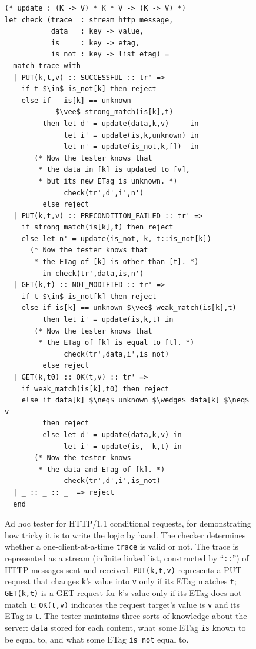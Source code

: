 \documentclass{article}
\newcommand{\http}{HTTP/1.1\xspace}
\newcommand{\ilc}[1]{\lstinline[style=customcoq]{#1}}
\theoremstyle{definition}
\begin{document}
\begin{figure}
  \begin{lstlisting}[style=customcoq,mathescape=true]
(* update : (K -> V) * K * V -> (K -> V) *)
let check (trace  : stream http_message,
           data   : key -> value,
           is     : key -> etag,
           is_not : key -> list etag) =
  match trace with
  | PUT(k,t,v) :: SUCCESSFUL :: tr' =>
    if t $\in$ is_not[k] then reject
    else if   is[k] == unknown
            $\vee$ strong_match(is[k],t)
         then let d' = update(data,k,v)     in
              let i' = update(is,k,unknown) in
              let n' = update(is_not,k,[])  in
       (* Now the tester knows that
        * the data in [k] is updated to [v],
        * but its new ETag is unknown. *)
              check(tr',d',i',n')
         else reject
  | PUT(k,t,v) :: PRECONDITION_FAILED :: tr' =>
    if strong_match(is[k],t) then reject
    else let n' = update(is_not, k, t::is_not[k])
      (* Now the tester knows that
       * the ETag of [k] is other than [t]. *)
         in check(tr',data,is,n')
  | GET(k,t) :: NOT_MODIFIED :: tr' =>
    if t $\in$ is_not[k] then reject
    else if is[k] == unknown $\vee$ weak_match(is[k],t)
         then let i' = update(is,k,t) in
       (* Now the tester knows that
        * the ETag of [k] is equal to [t]. *)
              check(tr',data,i',is_not)
         else reject
  | GET(k,t0) :: OK(t,v) :: tr' =>
    if weak_match(is[k],t0) then reject
    else if data[k] $\neq$ unknown $\wedge$ data[k] $\neq$ v
         then reject
         else let d' = update(data,k,v) in
              let i' = update(is,  k,t) in
       (* Now the tester knows
        * the data and ETag of [k]. *)
              check(tr',d',i',is_not)
  | _ :: _ :: _  => reject
  end
  \end{lstlisting}
  \caption{Ad hoc tester for \http conditional requests, for demonstrating how
    tricky it is to write the logic by hand.  The checker determines whether a
    one-client-at-a-time \ilc{trace} is valid or not.  The trace is represented
    as a stream (infinite linked list, constructed by ``\ilc{::}'') of HTTP
    messages sent and received.
    \ilc{PUT(k,t,v)} represents a PUT
    request that changes \ilc{k}'s value into \ilc{v} only if its ETag matches
    \ilc{t}; \ilc{GET(k,t)} is a GET request for \ilc{k}'s value only if its
    ETag does not match \ilc{t}; \ilc{OK(t,v)} indicates the request target's
    value is \ilc{v} and its ETag is \ilc{t}.  The tester maintains three
    sorts of  knowledge about
    the server: \ilc{data} stored for each content, what some
    ETag \ilc{is} known to be equal to, and what some ETag \ilc{is_not} equal
    to.
  }
  \label{fig:etag-tester}
\end{figure}
\end{document}
